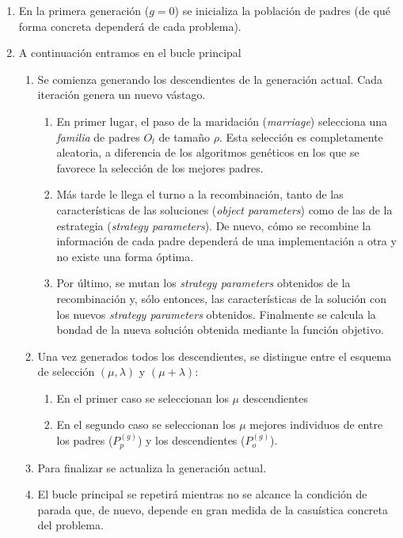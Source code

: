 \documentclass[12pt]{article} \usepackage[utf8x]{inputenc}
\begin{document}
\begin{enumerate}
\item En la primera generación ($g = 0$) se inicializa la población de padres (de qué forma concreta dependerá de cada problema).
\item A continuación entramos en el bucle principal
  \begin{enumerate}
  \item Se comienza generando los descendientes de la generación actual. Cada iteración genera un nuevo vástago.
    \begin{enumerate}
    \item En primer lugar, el paso de la maridación (\textit{marriage}) selecciona una \textit{familia} de padres $O_l$ de tamaño $\rho$. Esta selección es completamente aleatoria, a diferencia de los algoritmos genéticos en los que se favorece la selección de los mejores padres.
    \item Más tarde le llega el turno a la recombinación, tanto de las características de las soluciones (\textit{object parameters}) como de las de la estrategia (\textit{strategy parameters}). De nuevo, cómo se recombine la información de cada padre dependerá de una implementación a otra y no existe una forma óptima.
    \item Por último, se mutan los \textit{strategy parameters} obtenidos de la recombinación y, sólo entonces, las características de la solución con los nuevos \textit{strategy parameters} obtenidos. Finalmente se calcula la bondad de la nueva solución obtenida mediante la función objetivo.
    \end{enumerate}
  \item Una vez generados todos los descendientes, se distingue entre el esquema de  selección $(\mu, \lambda)$ y $(\mu + \lambda)$:
    \begin{enumerate}
    \item En el primer caso se seleccionan los $\mu$ descendientes
    \item En el segundo caso se seleccionan los $\mu$ mejores individuos de entre los padres ($P_p^{(g)}$) y los descendientes ($P_o^{(g)}$).
    \end{enumerate}
  \item Para finalizar se actualiza la generación actual.
  \item El bucle principal se repetirá mientras no se alcance la condición de parada que, de nuevo, depende en gran medida de la casuística concreta del problema.
  \end{enumerate}
\end{enumerate}
\end{document}
